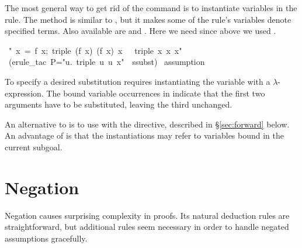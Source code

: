 The most general way to get rid of the {} command is 
to instantiate variables in the rule.  The method {} is
similar to , but it
makes some of the rule's variables  denote specified terms.  
Also available are {}  and .  Here we need
 since above we used
.
\begin{isabelle}
\ "{\isasymlbrakk}\ x\ =\ f\ x;\ triple\ (f\ x)\ (f\ x)\ x\ \isasymrbrakk\ \isasymLongrightarrow\ triple\ x\ x\ x"\isanewline
{}\ (erule_tac\
P="{\isasymlambda}u.\ triple\ u\
u\ x"\ \
ssubst)\isanewline
\isacommand{apply}\ assumption\isanewline
\isacommand{done}
\end{isabelle}
%
To specify a desired substitution 
requires instantiating the variable  with a $\lambda$-expression. 
The bound variable occurrences in  indicate that the first two arguments have to be substituted, leaving
the third unchanged.

An alternative to {} is to use \isa{rule} with the
{\isa{of}}  directive, described in \S\ref{sec:forward} below.   An
advantage  of {\isa{rule\_tac}} is that the instantiations may refer to 
variables bound in the current subgoal.


\section{Negation}
 
Negation causes surprising complexity in proofs.  Its natural 
deduction rules are straightforward, but additional rules seem 
necessary in order to handle negated assumptions gracefully. 

